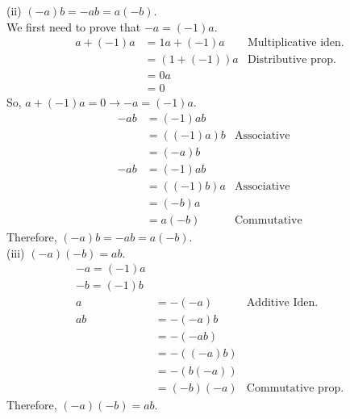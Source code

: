 \documentclass[paper=letter, fontsize=11pt]{scrartcl} %
\begin{document}
(ii) $(-a)b = -ab = a(-b)$.\\

We first need to prove that $-a = (-1)a$.
\begin{align*}
	a + (-1)a &= 1a + (-1)a &\text{Multiplicative iden.}\\
	&= (1 + (-1))a &\text{Distributive prop.}\\
	&= 0a \\
	&= 0
\end{align*}
So, $a + (-1)a = 0 \rightarrow -a = (-1)a$.\\
\begin{align*}
	-ab &= (-1)ab \\
	&= ((-1)a)b &\text{Associative}\\
	&= (-a)b\\
	-ab &= (-1)ab\\
	&= ((-1)b)a &\text{Associative}\\
	&=(-b)a\\
	&= a(-b) &\text{Commutative}
\end{align*}
Therefore, $(-a)b  = -ab = a(-b)$.\\

(iii) $(-a)(-b) = ab$.\\
\begin{align*}
	-a = (-1)a \\
	-b = (-1)b \\
	a &= -(-a) &\text{Additive Iden.}\\
	ab &= -(-a)b \\
	&= -(-ab) \\
	&= -((-a)b) \\
	&=-(b(-a)) \\
	&=(-b)(-a) &\text{Commutative prop.}
\end{align*}
Therefore, $(-a)(-b) = ab$.
\end{document}
